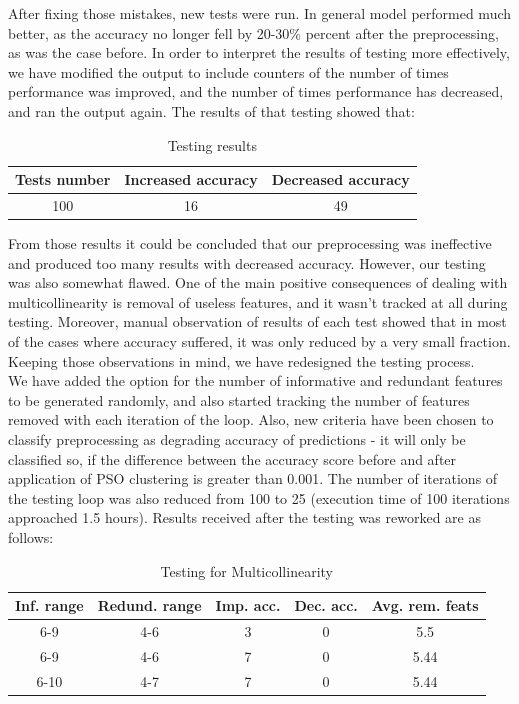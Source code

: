 \documentclass[conference]{IEEEtran}
\begin{document}
After fixing those mistakes, new tests were run. In general model performed much better, as the accuracy no longer fell by 20-30\% percent after the preprocessing, as was the case before. In order to interpret the results of testing more effectively, we have modified the output to include counters of the number of times performance was improved, and the number of times performance has decreased, and ran the output again. The results of that testing showed that:

\begin{table}[htbp]
	\caption{Testing results}
	\begin{center}
		\begin{tabular}{|c|c|c|}
			\hline
			\textbf{Tests number}&\textbf{Increased accuracy}&\textbf{Decreased accuracy} \\
			\hline
			100&16&49\\
			\hline
		\end{tabular}
		\label{tab1}
	\end{center}
\end{table}

From those results it could be concluded that our preprocessing was ineffective and produced too many results with decreased accuracy. However, our testing was also somewhat flawed. One of the main positive consequences of dealing with multicollinearity is removal of useless features, and it wasn't tracked at all during testing. Moreover, manual observation of results of each test showed that in most of the cases where accuracy suffered, it was only reduced by a very small fraction. Keeping those observations in mind, we have redesigned the testing process.\\

We have added the option for the number of informative and redundant features to be generated randomly, and also started tracking the number of features removed with each iteration of the loop. Also, new criteria have been chosen to classify preprocessing as degrading accuracy of predictions - it will only be classified so, if the difference between the accuracy score before and after application of PSO clustering is greater than 0.001. The number of iterations of the testing loop was also reduced from 100 to 25 (execution time of 100 iterations approached 1.5 hours). Results received after the testing was reworked are as follows:

\begin{table}[htbp]
	\caption{Testing for Multicollinearity}
	\begin{center}
		\begin{tabular}{|c|c|c|c|c|}
			\hline
			\textbf{Inf. range}&\textbf{Redund. range}&\textbf{Imp. acc.}&\textbf{Dec. acc.}&\textbf{Avg. rem. feats} \\
			\hline 
			6-9& 4-6& 3& 0& 5.5 \\
			\hline 
			6-9& 4-6& 7& 0& 5.44 \\
			\hline 
			6-10& 4-7& 7& 0& 5.44 \\
			\hline
		\end{tabular}
		\label{tab2}
	\end{center}
\end{table}
\end{document}
